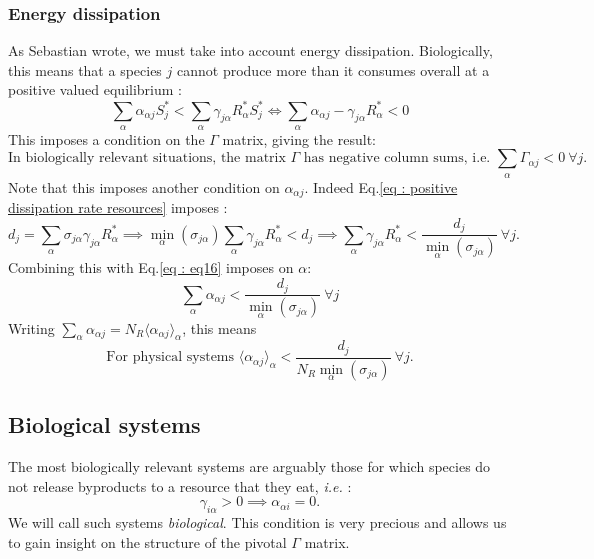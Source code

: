 \documentclass[12pt]{article}
\newcommand{\av}[1]{\langle #1 \rangle}
\newcommand{\ie}{\textit{i.e.} }
\begin{document}
			\subsubsection{Energy dissipation}
	As Sebastian wrote, we must take into account energy dissipation. Biologically, this means that a species $j$ cannot produce more than it consumes overall at a positive valued equilibrium : 
	\begin{equation}
		\sum_{\alpha}\alpha_{\alpha j}S^*_j <  \sum_{\alpha} \gamma_{j \alpha}R^*_\alpha S^*_j \iff \sum_{\alpha} \alpha_{\alpha j} - \gamma_{j \alpha}R^*_\alpha < 0 \label{eq : eq16}
	\end{equation}
	This imposes a condition on the $\Gamma$ matrix, giving the result:
	\begin{equation} 
		\boxed{\text{In biologically relevant situations, the matrix $\Gamma$ has negative column sums, i.e. $\sum_\alpha \Gamma_{\alpha j}<0 \ \forall j$.}} \label{eq : dissipation condition}
	\end{equation} 
	Note that this imposes another condition on $\alpha_{\alpha j}$. Indeed Eq.\eqref{eq : positive dissipation rate resources} imposes :
	\begin{equation}
		d_j = \sum_\alpha \sigma_{j\alpha}\gamma_{j\alpha}R^*_\alpha \implies  \min_\alpha\left(\sigma_{j\alpha}\right) \sum_\alpha \gamma_{j\alpha}R^*_\alpha < d_j  \implies \sum_\alpha \gamma_{j\alpha}R^*_\alpha < \frac{d_j}{\min_\alpha\left(\sigma_{j\alpha}\right)} \ \forall j.
	\end{equation}
	Combining this with Eq.\eqref{eq : eq16} imposes on $\alpha$:
	\begin{equation}
		\sum_\alpha \alpha_{\alpha j} < \frac{d_j}{\min_\alpha\left(\sigma_{j\alpha}\right)} \ \forall j
	\end{equation}
	Writing $\sum_\alpha \alpha_{\alpha j} = N_R \av{\alpha_{\alpha j}}_\alpha$, this means
	\begin{equation}
		\boxed{\text{For physical systems }\av{\alpha_{\alpha j}}_\alpha < \frac{d_j}{N_R \min_\alpha\left(\sigma_{j\alpha}\right)} \ \forall j.}
	\end{equation}
		\subsection{Biological systems}
	The most biologically relevant systems are arguably those for which species do not release byproducts to a resource that they eat, \ie :
	\begin{equation}
		\gamma_{i\alpha} > 0 \implies \alpha_{\alpha i} = 0. \label{eq : biological condition}
	\end{equation} 
	We will call such systems \textit{biological}. This condition is very precious and allows us to gain insight on the structure of the pivotal $\Gamma$ matrix.
	
\end{document}
